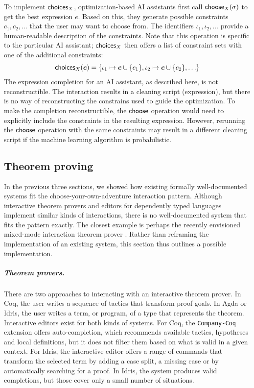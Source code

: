 \documentclass[ a4paper,UKenglish,cleveref, autoref, thm-restate]{lipics-v2021}
\newcommand{\ident}[1]{\textsf{#1}}
\newcommand{\select}{\textnormal{\ident{choose}}}
\newcommand{\choices}{\textnormal{\ident{choices}}}
\begin{document}
To implement $\choices_X$, optimization-based AI assistants first call $\select_X(\sigma)$ to
get the best expression $e$. Based on this, they generate possible constraints $c_1, c_2, \ldots$
that the user may want to choose from. The identifiers $\iota_1,\iota_2, \ldots$ provide a
human-readable description of the constraints. Note that this operation is specific to the particular
AI assistant; $\choices_X$ then offers a list of constraint sets with one of the additional constraints:
\[
\choices_X(\boldsymbol{c}) = \{\iota_1 \mapsto \boldsymbol{c}\cup\{ c_1 \}, \iota_2\mapsto\boldsymbol{c}\cup\{ c_2 \}, \ldots\}
\]
The expression completion for an AI assistant, as described here, is not reconstructible.
The inter\-action results in a cleaning script (expression), but there is no way of reconstructing
the constrains used to guide the optimization. To make the completion reconstructible, the
$\select$ operation would need to explicitly include the constraints in the resulting expression.
However, rerunning the $\select$ operation with the same constraints may result in a different
cleaning script if the machine learning algorithm is probabilistic.


\subsection{Theorem proving}
\label{sec:examples-thm}

In the previous three sections, we showed how existing formally well-documented systems fit the
choose-your-own-adventure interaction pattern. Although interactive theorem provers and editors
for dependently typed languages implement similar kinds of interactions, there is no well-documented
system that fits the pattern exactly. The closest example is perhaps the recently envisioned
mixed-mode interaction theorem prover \cite{verter-2024-mixed}. Rather than reframing the
implementation of an existing system, this section thus outlines a possible implementation.

\subparagraph{Theorem provers.}
There are two approaches to interacting with an interactive theorem prover. In Coq, the user
writes a sequence of tactics that transform proof goals. In Agda or Idris, the user writes a
term, or program, of a type that represents the theorem. Interactive editors exist for both
kinds of systems. For Coq, the \texttt{Company-Coq} \cite{pitclaudel-2016-companycoq,aspinall-2000-general}
extension offers auto-completion, which recommends available tactics, hypotheses and local
definitions, but it does not filter them based on what is valid in a given context.
For Idris, the interactive editor \cite{brady-2015-idris} offers a range of commands that
transform the selected term by adding a case split, a missing case or by automatically searching
for a proof. In Idris, the system produces valid completions, but those cover only a small number
of situations.
\end{document}

